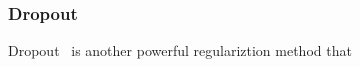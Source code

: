 \subsubsection{Dropout}

Dropout~\cite{JMLR:v15:srivastava14a} is another powerful regulariztion method that 